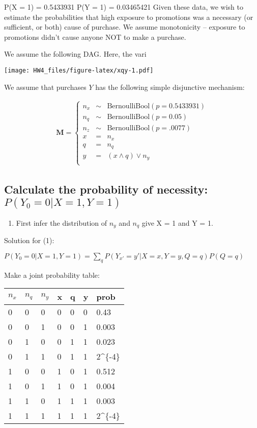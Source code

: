 \documentclass[]{article}
\providecommand{\tightlist}{%
  \setlength{\itemsep}{0pt}\setlength{\parskip}{0pt}}
\begin{document}
P(X = 1) = 0.5433931 P(Y = 1) = 0.03465421 Given these data, we wish to
estimate the probabilities that high exposure to promotions was a
necessary (or sufficient, or both) cause of purchase. We assume
monotonicity -- exposure to promotions didn't cause anyone NOT to make a
purchase.

We assume the following DAG. Here, the vari

\texttt{[image: HW4\_files/figure-latex/xqy-1.pdf]}

We assume that purchases \(Y\) has the following simple disjunctive
mechanism:

\begin{align} 
\mathbf{M} =
\left\{\begin{matrix}
n_x &\sim &\text{BernoulliBool}(p=0.5433931)\\ 
n_q &\sim &\text{BernoulliBool}(p=0.05)\\ 
n_z &\sim &\text{BernoulliBool}(p=.0077)\\ 
x &= &n_x \\ 
q &= &n_q \\
y &= &(x \wedge q) \vee n_y
\\ 
\end{matrix}\right. \nonumber
\end{align}

\subsection{\texorpdfstring{Calculate the probability of necessity:
\(P(Y_{0} = 0| X = 1, Y = 1)\)}{Calculate the probability of necessity: P(Y\_\{0\} = 0\textbar{} X = 1, Y = 1)}}\label{calculate-the-probability-of-necessity-py_0-0-x-1-y-1}

\begin{enumerate}
\def\labelenumi{\arabic{enumi}.}
\tightlist
\item
  First infer the distribution of \(n_y\) and \(n_q\) give X = 1 and Y =
  1.
\end{enumerate}

Solution for (1):

\(P(Y_{0} = 0| X = 1, Y = 1) = \sum_q P(Y_{x'} = y'| X = x, Y = y, Q = q)P(Q = q)\)

Make a joint probability table:

\begin{longtable}[]{@{}lllllll@{}}
\toprule
\(n_x\) & \(n_q\) & \(n_y\) & x & q & y & prob\tabularnewline
\midrule
\endhead
0 & 0 & 0 & 0 & 0 & 0 & 0.43\tabularnewline
0 & 0 & 1 & 0 & 0 & 1 & 0.003\tabularnewline
0 & 1 & 0 & 0 & 1 & 1 & 0.023\tabularnewline
0 & 1 & 1 & 0 & 1 & 1 & 2\times 10\^{}\{-4\}\tabularnewline
1 & 0 & 0 & 1 & 0 & 1 & 0.512\tabularnewline
1 & 0 & 1 & 1 & 0 & 1 & 0.004\tabularnewline
1 & 1 & 0 & 1 & 1 & 1 & 0.003\tabularnewline
1 & 1 & 1 & 1 & 1 & 1 & 2\times 10\^{}\{-4\}\tabularnewline
\bottomrule
\end{longtable}
\end{document}
